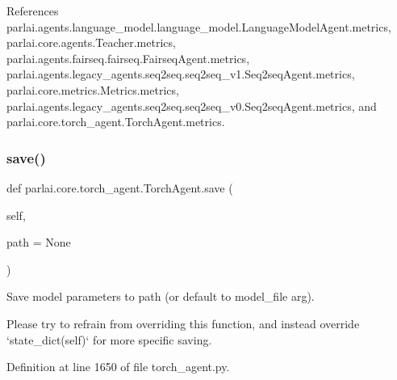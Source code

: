 References parlai.\+agents.\+language\+\_\+model.\+language\+\_\+model.\+Language\+Model\+Agent.\+metrics, parlai.\+core.\+agents.\+Teacher.\+metrics, parlai.\+agents.\+fairseq.\+fairseq.\+Fairseq\+Agent.\+metrics, parlai.\+agents.\+legacy\+\_\+agents.\+seq2seq.\+seq2seq\+\_\+v1.\+Seq2seq\+Agent.\+metrics, parlai.\+core.\+metrics.\+Metrics.\+metrics, parlai.\+agents.\+legacy\+\_\+agents.\+seq2seq.\+seq2seq\+\_\+v0.\+Seq2seq\+Agent.\+metrics, and parlai.\+core.\+torch\+\_\+agent.\+Torch\+Agent.\+metrics.

\mbox{\label{classparlai_1_1core_1_1torch__agent_1_1TorchAgent_adac7ee3db855786e8414e9f35fcb6e46}} 
\subsubsection{\texorpdfstring{save()}{save()}}
{\footnotesize\ttfamily def parlai.\+core.\+torch\+\_\+agent.\+Torch\+Agent.\+save (\begin{DoxyParamCaption}\item[{}]{self,  }\item[{}]{path = {\ttfamily None} }\end{DoxyParamCaption})}

\begin{DoxyVerb}Save model parameters to path (or default to model_file arg).

Please try to refrain from overriding this function, and instead
override `state_dict(self)` for more specific saving.
\end{DoxyVerb}
 

Definition at line 1650 of file torch\+\_\+agent.\+py.



